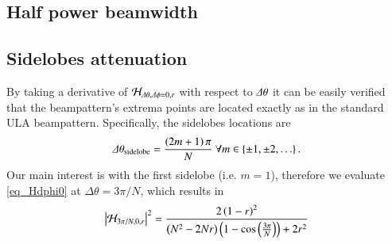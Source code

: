 \subsection*{Half power beamwidth}

\subsection*{Sidelobes attenuation}
\ifdefined\showDev
\else
\fi
By taking a derivative of $\mathcal{H}_{\Delta\theta,\Delta\phi=0,r}$ with respect to $\Delta\theta$ it can be easily verified that the beampattern's extrema points are located exactly as in the standard ULA beampattern. Specifically, the sidelobes locations are
\begin{equation}
    \label{eqn_CB_sidelobesLocations}
    \Delta\theta_{\text{sidelobe}} = \frac{\rBrace{2m+1}\pi}{N}\ \forall m\in\cBrace{\pm 1,\pm 2,\hdots}.
\end{equation}
Our main interest is with the first sidelobe (i.e. $m=1$), therefore we evaluate \eqref{eq_Hdphi0} at $\Delta\theta = 3\pi/N$, which results in
\begin{equation}
    \abs{\Hr_{{3\pi}/{N},0,r}}^2
    =
    \frac{
    2\rBrace{1-r}^{2}
    }{
    \rBrace{N^{2}-2Nr}\rBrace{1-\cos{\rBrace{\frac{3\pi}{N}}}}+2r^{2}
    }
    \label{eq_HSidelobes}
\end{equation}
